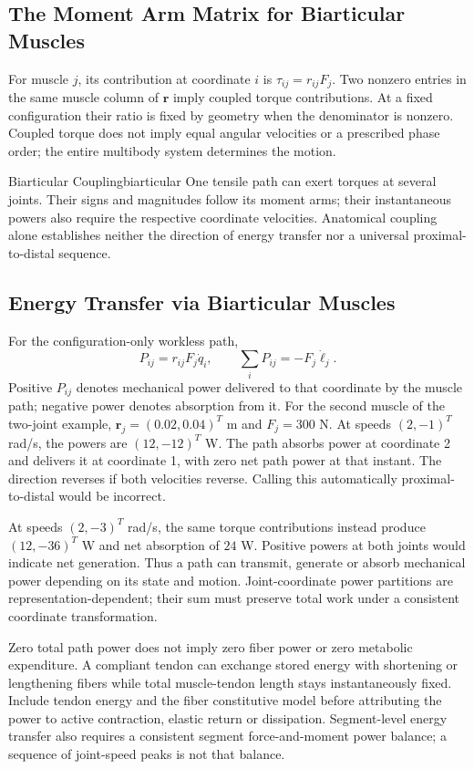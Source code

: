 \subsection{The Moment Arm Matrix for Biarticular Muscles}

For muscle $j$, its contribution at coordinate $i$ is $\tau_{ij}=r_{ij}F_j$. Two nonzero entries in the same muscle column of $\bm r$ imply coupled torque contributions. At a fixed configuration their ratio is fixed by geometry when the denominator is nonzero. Coupled torque does not imply equal angular velocities or a prescribed phase order; the entire multibody system determines the motion.

\begin{definition}{Biarticular Coupling}{biarticular}
One tensile path can exert torques at several joints. Their signs and magnitudes follow its moment arms; their instantaneous powers also require the respective coordinate velocities. Anatomical coupling alone establishes neither the direction of energy transfer nor a universal proximal-to-distal sequence.
\end{definition}

\subsection{Energy Transfer via Biarticular Muscles}

For the configuration-only workless path,
\[
P_{ij}=r_{ij}F_j\dot q_i,\qquad
\sum_iP_{ij}=-F_j\dot\ell_j.
\]
Positive $P_{ij}$ denotes mechanical power delivered to that coordinate by the muscle path; negative power denotes absorption from it. For the second muscle of the two-joint example, $\bm r_j=(0.02,0.04)^T$ m and $F_j=300$ N. At speeds $(2,-1)^T$ rad/s, the powers are $(12,-12)^T$ W. The path absorbs power at coordinate 2 and delivers it at coordinate 1, with zero net path power at that instant. The direction reverses if both velocities reverse. Calling this automatically proximal-to-distal would be incorrect.

At speeds $(2,-3)^T$ rad/s, the same torque contributions instead produce $(12,-36)^T$ W and net absorption of $24$ W. Positive powers at both joints would indicate net generation. Thus a path can transmit, generate or absorb mechanical power depending on its state and motion. Joint-coordinate power partitions are representation-dependent; their sum must preserve total work under a consistent coordinate transformation.

Zero total path power does not imply zero fiber power or zero metabolic expenditure. A compliant tendon can exchange stored energy with shortening or lengthening fibers while total muscle-tendon length stays instantaneously fixed. Include tendon energy and the fiber constitutive model before attributing the power to active contraction, elastic return or dissipation. Segment-level energy transfer also requires a consistent segment force-and-moment power balance; a sequence of joint-speed peaks is not that balance.

